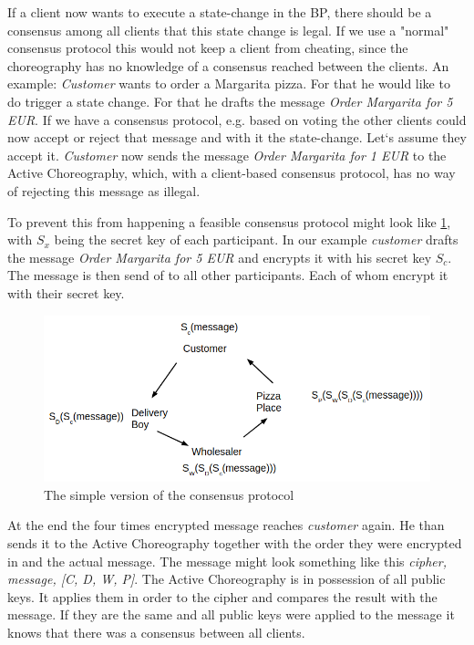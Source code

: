 \documentclass[runningheads]{llncs}
\begin{document}
If a client now wants to execute a state-change in the BP, there should be a consensus among all clients that this state change is legal. If we use a "normal" consensus protocol this would not keep a client from cheating, since the choreography has no knowledge of a consensus reached between the clients. An example: \textit{Customer} wants to order a Margarita pizza. For that he would like to do trigger a state change. For that he drafts the message \textit{Order Margarita for 5 EUR}. If we have a consensus protocol, e.g. based on voting the other clients could now accept or reject that message and with it the state-change. Let`s assume they accept it. \textit{Customer} now sends the message \textit{Order Margarita for 1 EUR} to the Active Choreography, which, with a client-based consensus protocol, has no way of rejecting this message as illegal. 

To prevent this from happening a feasible consensus protocol might look like \ref{fig:simple}, with $S_x$ being the secret key of each participant. In our example \textit{customer} drafts the message \textit{Order Margarita for 5 EUR} and encrypts it with his secret key $S_c$. The message is then send of to all other participants. Each of whom encrypt it with their secret key. 


\begin{figure}
    \centering
    \includegraphics[scale=0.6]{simple_consensus.png}
    \caption{The simple version of the consensus protocol}
    \label{fig:simple}
\end{figure}


At the end the four times encrypted message reaches \textit{customer} again. He than sends it to the Active Choreography together with the order they were encrypted in and the actual message. The message might look something like this \textit{cipher, message, [C, D, W, P]}. The Active Choreography is in possession of all public keys. It applies them in order to the cipher and compares the result with the message. If they are the same and all public keys were applied to the message it knows that there was a consensus between all clients. 
\end{document}

